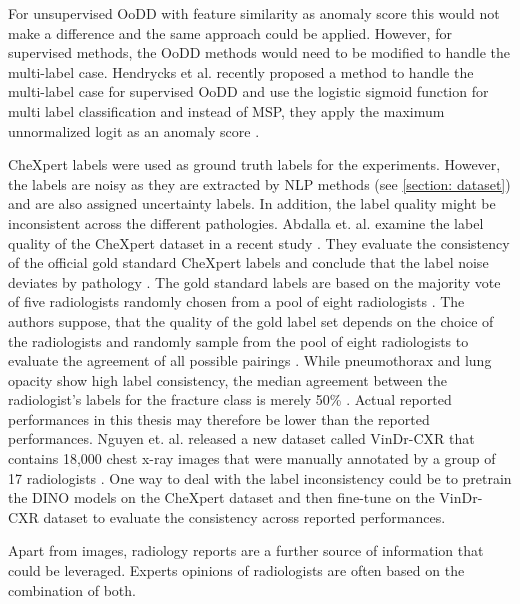 For unsupervised OoDD with feature similarity as anomaly score this would not make a difference and the same approach could be applied.
However, for supervised methods, the OoDD methods would need to be modified to handle the multi-label case.
Hendrycks et al. recently proposed a method to handle the multi-label case for supervised OoDD and use the logistic sigmoid function for multi label classification and instead of MSP, they apply the maximum unnormalized logit as an anomaly score \citep{Hendrycks2022}.
\par
CheXpert labels were used as ground truth labels for the experiments.
However, the labels are noisy as they are extracted by NLP methods (see \ref{section: dataset}) and are also assigned uncertainty labels.
In addition, the label quality might be inconsistent across the different pathologies.
Abdalla et. al. examine the label quality of the CheXpert dataset in a recent study \citep{Abdalla2023}.
They evaluate the consistency of the official gold standard CheXpert labels and conclude that the label noise deviates by pathology \citep{Abdalla2023}.
The gold standard labels are based on the majority vote of five radiologists randomly chosen from a pool of eight radiologists \citep{Irvin2019}.
The authors suppose, that the quality of the gold label set depends on the choice of the radiologists and randomly sample from the pool of eight radiologists to evaluate the agreement of all possible pairings \citep{Abdalla2023}. 
While pneumothorax and lung opacity show high label consistency, the median agreement between the radiologist's labels for the fracture class is merely 50\% \citep{Abdalla2023}.
Actual reported performances in this thesis may therefore be lower than the reported performances.
Nguyen et. al. released a new dataset called VinDr-CXR that contains 18,000 chest x-ray images that were manually annotated by a group of 17 radiologists \citep{Nguyen2022}.
One way to deal with the label inconsistency could be to pretrain the DINO models on the CheXpert dataset and then fine-tune on the VinDr-CXR dataset to evaluate the consistency across reported performances.
\par
Apart from images, radiology reports are a further source of information that could be leveraged. 
Experts opinions of radiologists are often based on the combination of both. 
